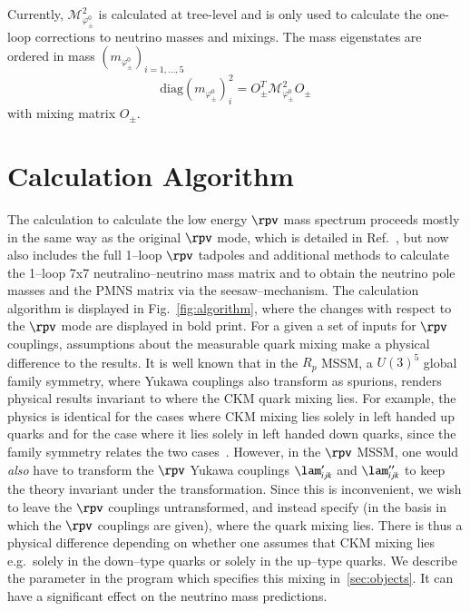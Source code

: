 \documentclass[pdflatex,final,3p,times]{elsarticle}
\begin{document}

Currently, ${\mathcal M}^2_{\varphi^0_\pm}$ is calculated at tree-level and is
only used to calculate the one-loop corrections to neutrino masses and
mixings. 
The mass eigenstates are ordered in mass $(m_{\varphi^0_\pm})_{i=1,\ldots,5}$
\begin{equation}
  \label{eq:scalMix}
  \mbox{diag} (m_{\varphi^0_\pm})_i^2 = O_\pm^T {\mathcal M}^2_{\varphi^0_\pm}
  O_\pm 
\end{equation}
with mixing matrix $O_\pm$. 

\section{Calculation Algorithm \label{sec:calculation}}

The calculation to calculate the low energy 
$\rpv$ mass spectrum proceeds mostly in the same way as the original $\rpv$
mode, which is detailed in Ref.~\cite{Allanach:2009bv}, but now also includes the
 full 1--loop $\rpv$ tadpoles and additional
methods to calculate the 1--loop 7x7 neutralino--neutrino mass matrix 
and to obtain the neutrino pole masses and the
PMNS matrix via the seesaw--mechanism. The calculation algorithm is displayed
in Fig.~\ref{fig:algorithm}, where the changes with respect to the $\rpv$ mode are displayed 
in bold print.
For a given a set of inputs for $\rpv$ couplings, assumptions about the
measurable quark mixing make a physical difference to the results. It is well
known that in the $R_p$ MSSM, a $U(3)^5$ global family symmetry,
where Yukawa couplings also transform as spurions,
renders
physical results invariant to where the CKM quark mixing lies. 
For example, the physics is identical for the cases where CKM mixing lies
solely in left handed up quarks and for the case where it lies solely in
left handed down quarks, since
the family symmetry relates the two cases~\cite{aaa}.  
However, in the $\rpv$ MSSM, one would {\em also}\/ have to transform 
the $\rpv$ Yukawa couplings $\lam'_{ijk}$ and $\lam''_{ijk}$ to keep the
theory invariant under the transformation. Since this is inconvenient, we wish
to leave the $\rpv$ couplings untransformed, and instead specify (in the basis
in which the $\rpv$ couplings are given), where the quark mixing lies. 
There is thus a physical difference depending on whether one assumes that CKM
mixing 
lies e.g.\ solely in the down--type quarks or solely in the up--type quarks. We
describe  the parameter in the program 
which specifies this mixing in~\ref{sec:objects}. It can have a significant
effect on the neutrino mass 
predictions. 
\end{document}
